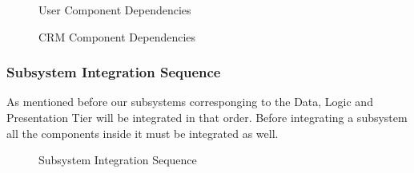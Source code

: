 \documentclass[a4paper]{article}
\begin{document}
\newpage
\begin{figure}[h]
\centering
\vspace*{\fill}
\noindent{}%
\caption {User Component Dependencies}
\vspace*{0.5cm}
\end{figure} 

\begin{figure}[h]
\centering
\vspace*{\fill}
\noindent{}%
\caption {CRM Component Dependencies}
\vspace*{0.5cm}
\end{figure}
 
\newpage
\subsubsection{Subsystem Integration Sequence}
As mentioned before our subsystems corresponging to the Data, Logic and Presentation Tier will be integrated in that order. Before integrating a subsystem all the components inside it must be integrated as well.
\begin{figure}[h]
\centering
\vspace*{\fill}
\noindent{}%
\caption {Subsystem Integration Sequence}
\vspace*{0.5cm}
\end{figure}
\end{document}
